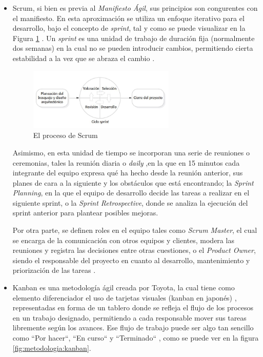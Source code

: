        \begin{itemize}
            \item Scrum, si bien es previa al \textit{Manifiesto Ágil}, sus principios son congurentes con el manifiesto. En esta aproximación se utiliza un enfoque iterativo para el desarrollo, bajo el concepto de \textit{sprint}, tal y como se puede visualizar en la Figura \ref{fig:metodologia:scrum} . Un \textit{sprint} es una unidad de trabajo de duración fija (normalmente dos semanas) en la cual no se pueden introducir cambios, permitiendo cierta estabilidad a la vez que se abraza el cambio \cite{pressman_software_2005}. 
    
            \begin{figure}[h]
                \centering
                \includegraphics[width=0.66\textwidth]{figures/scrum.JPG}
                \caption[El proceso de Scrum, extraído de \cite{sommerville_software_2011}]{El proceso de Scrum}
                \label{fig:metodologia:scrum}
            \end{figure}
            
            Asimismo, en esta unidad de tiempo se incorporan una serie de reuniones o ceremonias, tales la reunión diaria o \textit{daily} ,en la que en 15 minutos cada integrante del equipo expresa qué ha hecho desde la reunión anterior, sus planes de cara a la siguiente y los obstáculos que está encontrando; la \textit{Sprint Planning}, en la que el equipo de desarrollo decide las tareas a realizar en el siguiente sprint, o la \textit{Sprint Retrospective}, donde se analiza la ejecución del sprint anterior para plantear posibles mejoras. 
    
            Por otra parte, se definen roles en el equipo tales como \textit{Scrum Master}, el cual se encarga de la comunicación con otros equipos y clientes, modera las reuniones y registra las decisiones entre otras cuestiones, o el \textit{Product Owner}, siendo el responsable del proyecto en cuanto al desarrollo, mantenimiento y priorización de las tareas \cite{valtx_metodologias_2023}.
    
            \item Kanban es una metodología ágil creada por Toyota, la cual tiene como elemento diferenciador el uso de tarjetas visuales (kanban en japonés) \cite{pzt_metodologias_nodate}, representadas en forma de un tablero donde se refleja el flujo de los procesos en un trabajo designado, permitiendo a cada responsable mover sus tareas libremente según los avances. Ese flujo de trabajo puede ser algo tan sencillo como ``Por hacer``, ``En curso`` y ``Terminado`` \cite{atlassian_que_nodate-1}, como se puede ver en la figura \ref{fig:metodologia:kanban}.
    

\end{itemize}
